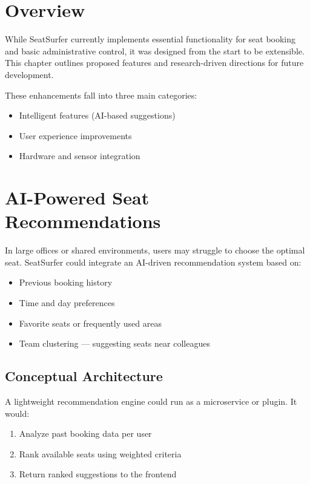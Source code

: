 \documentclass[12pt,a4paper]{report}
\begin{document}
\section{Overview}

While SeatSurfer currently implements essential functionality for seat booking and basic administrative control, it was designed from the start to be extensible. This chapter outlines proposed features and research-driven directions for future development.

These enhancements fall into three main categories:
\begin{itemize}
    \item Intelligent features (AI-based suggestions)
    \item User experience improvements
    \item Hardware and sensor integration
\end{itemize}

\section{AI-Powered Seat Recommendations}

In large offices or shared environments, users may struggle to choose the optimal seat. SeatSurfer could integrate an AI-driven recommendation system based on:
\begin{itemize}
    \item Previous booking history
    \item Time and day preferences
    \item Favorite seats or frequently used areas
    \item Team clustering — suggesting seats near colleagues
\end{itemize}

\subsection*{Conceptual Architecture}

A lightweight recommendation engine could run as a microservice or plugin. It would:
\begin{enumerate}
    \item Analyze past booking data per user
    \item Rank available seats using weighted criteria
    \item Return ranked suggestions to the frontend
\end{enumerate}
\end{document}
